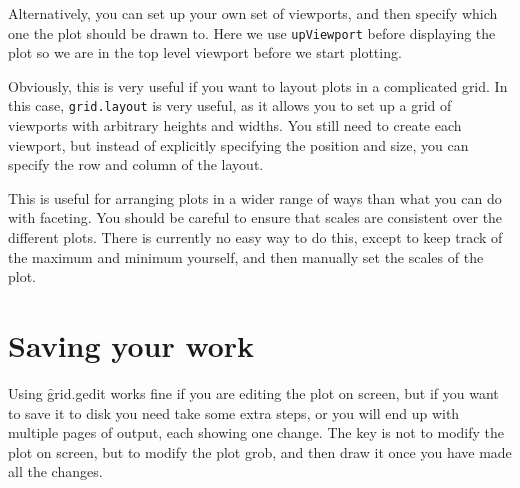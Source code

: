 Alternatively, you can set up your own set of viewports, and then specify which one the plot should be drawn to.  Here we use {\tt upViewport} before displaying the plot so we are in the top level viewport before we start plotting.

% 

Obviously, this is very useful if you want to layout plots in a complicated grid.  In this case, {\tt grid.layout} is very useful, as it allows you to set up a grid of viewports with arbitrary heights and widths.  You still need to create each viewport, but instead of explicitly specifying the position and size, you can specify the row and column of the layout.

% 
% 
% 

This is useful for arranging plots in a wider range of ways than what you can do with faceting.   You should be careful to ensure that scales are consistent over the different plots.  There is currently no easy way to do this, except to keep track of the maximum and minimum yourself, and then manually set the scales of the plot.

\section{Saving your work} 
\label{sec:grid-save}

Using \f{grid.gedit} works fine if you are editing the plot on screen, but if you want to save it to disk you need take some extra steps, or you will end up with multiple pages of output, each showing one change.  The key is not to modify the plot on screen, but to modify the plot grob, and then draw it once you have made all the changes.  

% 
% 


